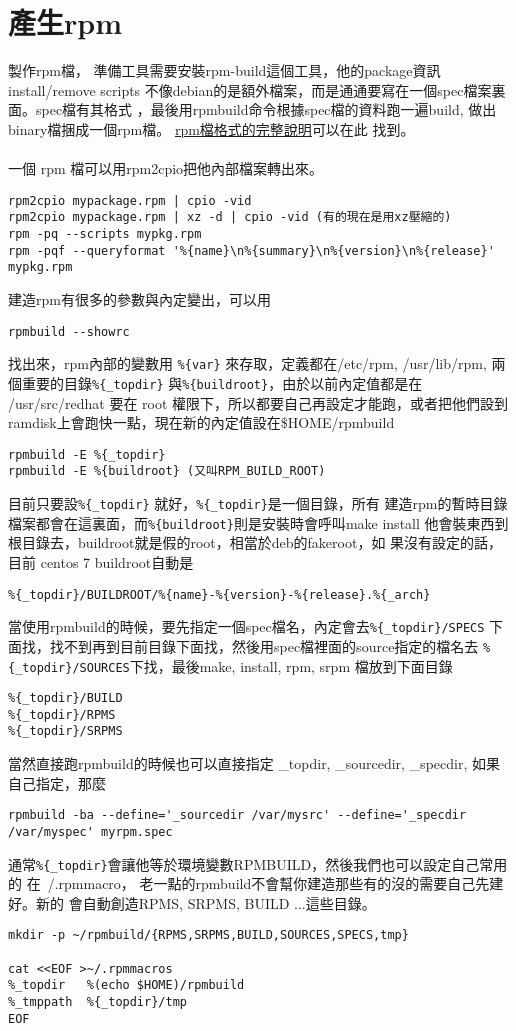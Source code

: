 \section{產生rpm}
製作rpm檔， 準備工具需要安裝rpm-build這個工具，他的package資訊install/remove 
scripts 不像debian的是額外檔案，而是通通要寫在一個spec檔案裏面。spec檔有其格式
，最後用rpmbuild命令根據spec檔的資料跑一遍build, 做出binary檔捆成一個rpm檔。
\href{http://www.rpm.org/max-rpm/index.html}{rpm檔格式的完整說明}可以在此
找到。
\\\\
一個 rpm 檔可以用rpm2cpio把他內部檔案轉出來。
\begin{verbatim}
rpm2cpio mypackage.rpm | cpio -vid
rpm2cpio mypackage.rpm | xz -d | cpio -vid (有的現在是用xz壓縮的)
rpm -pq --scripts mypkg.rpm
rpm -pqf --queryformat '%{name}\n%{summary}\n%{version}\n%{release}' mypkg.rpm
\end{verbatim}
建造rpm有很多的參數與內定變出，可以用
\begin{verbatim}
rpmbuild --showrc
\end{verbatim}
找出來，rpm內部的變數用 \verb=%{var}= 來存取，定義都在/etc/rpm, /usr/lib/rpm,
兩個重要的目錄\verb=%{_topdir}= 與\verb=%{buildroot}=，由於以前內定值都是在
/usr/src/redhat 要在 root 權限下，所以都要自己再設定才能跑，或者把他們設到
ramdisk上會跑快一點，現在新的內定值設在\$HOME/rpmbuild
\begin{verbatim}
rpmbuild -E %{_topdir}
rpmbuild -E %{buildroot} (又叫RPM_BUILD_ROOT)
\end{verbatim}
目前只要設\verb=%{_topdir}= 就好，\verb=%{_topdir}=是一個目錄，所有
建造rpm的暫時目錄檔案都會在這裏面，而\verb=%{buildroot}=則是安裝時會呼叫make
install 他會裝東西到根目錄去，buildroot就是假的root，相當於deb的fakeroot，如
果沒有設定的話，目前 centos 7 buildroot自動是
\begin{verbatim}
%{_topdir}/BUILDROOT/%{name}-%{version}-%{release}.%{_arch}
\end{verbatim}
當使用rpmbuild的時候，要先指定一個spec檔名，內定會去\verb=%{_topdir}/SPECS=
下面找，找不到再到目前目錄下面找，然後用spec檔裡面的source指定的檔名去
\verb=%{_topdir}/SOURCES=下找，最後make, install, rpm, srpm 檔放到下面目錄
\begin{verbatim}
%{_topdir}/BUILD
%{_topdir}/RPMS
%{_topdir}/SRPMS
\end{verbatim}
當然直接跑rpmbuild的時候也可以直接指定
\_topdir, \_sourcedir, \_specdir, 如果自己指定，那麼
\begin{verbatim}
rpmbuild -ba --define='_sourcedir /var/mysrc' --define='_specdir /var/myspec' myrpm.spec
\end{verbatim}
通常\verb=%{_topdir}=會讓他等於環境變數RPMBUILD，然後我們也可以設定自己常用的
在~/.rpmmacro， 老一點的rpmbuild不會幫你建造那些有的沒的需要自己先建好。新的
會自動創造RPMS, SRPMS, BUILD ...這些目錄。
\begin{verbatim}
mkdir -p ~/rpmbuild/{RPMS,SRPMS,BUILD,SOURCES,SPECS,tmp}

cat <<EOF >~/.rpmmacros
%_topdir   %(echo $HOME)/rpmbuild
%_tmppath  %{_topdir}/tmp
EOF
\end{verbatim}

